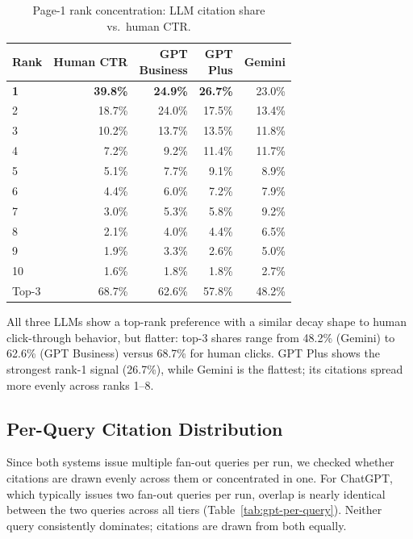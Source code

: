 \begin{table}[H]
\centering
\caption{Page-1 rank concentration: LLM citation share vs.\ human CTR.}
\label{tab:cross-rank-ctr}
\begin{tabular}{lrrrr}
\toprule
Rank & Human CTR & \makecell[r]{GPT\\Business} & \makecell[r]{GPT\\Plus} & Gemini \\
\midrule
\textbf{1} & \textbf{39.8\%} & \textbf{24.9\%} & \textbf{26.7\%} & 23.0\% \\
2 & 18.7\% & 24.0\% & 17.5\% & 13.4\% \\
3 & 10.2\% & 13.7\% & 13.5\% & 11.8\% \\
4 & 7.2\% & 9.2\% & 11.4\% & 11.7\% \\
5 & 5.1\% & 7.7\% & 9.1\% & 8.9\% \\
6 & 4.4\% & 6.0\% & 7.2\% & 7.9\% \\
7 & 3.0\% & 5.3\% & 5.8\% & 9.2\% \\
8 & 2.1\% & 4.0\% & 4.4\% & 6.5\% \\
9 & 1.9\% & 3.3\% & 2.6\% & 5.0\% \\
10 & 1.6\% & 1.8\% & 1.8\% & 2.7\% \\
\midrule
Top-3 & 68.7\% & 62.6\% & 57.8\% & 48.2\% \\
\bottomrule
\end{tabular}
\end{table}

All three LLMs show a top-rank preference with a similar decay shape to human click-through behavior, but flatter: top-3 shares range from 48.2\% (Gemini) to 62.6\% (GPT Business) versus 68.7\% for human clicks. GPT Plus shows the strongest rank-1 signal (26.7\%), while Gemini is the flattest; its citations spread more evenly across ranks 1--8.

\subsection{Per-Query Citation Distribution}
\label{sec:per-query-citation}

Since both systems issue multiple fan-out queries per run, we checked whether citations are drawn evenly across them or concentrated in one. For ChatGPT, which typically issues two fan-out queries per run, overlap is nearly identical between the two queries across all tiers (Table~\ref{tab:gpt-per-query}). Neither query consistently dominates; citations are drawn from both equally.

